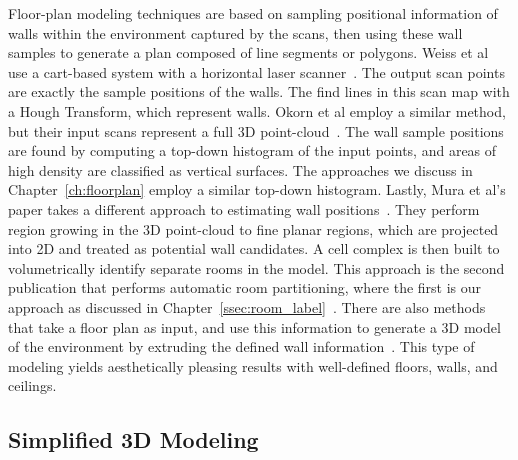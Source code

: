 \documentclass[12pt,onecolumn,oneside]{book}
\begin{document}
Floor-plan modeling techniques are based on sampling positional information of walls within the environment captured by the scans, then using these wall samples to generate a plan composed of line segments or polygons.  Weiss et al use a cart-based system with a horizontal laser scanner~\cite{Weiss05}.  The output scan points are exactly the sample positions of the walls.  The find lines in this scan map with a Hough Transform, which represent walls.  Okorn et al employ a similar method, but their input scans represent a full 3D point-cloud~\cite{Okorn09}.  The wall sample positions are found by computing a top-down histogram of the input points, and areas of high density are classified as vertical surfaces.  The approaches we discuss in Chapter~\ref{ch:floorplan} employ a similar top-down histogram.  Lastly, Mura et al's paper takes a different approach to estimating wall positions~\cite{Mura13}.  They perform region growing in the 3D point-cloud to fine planar regions, which are projected into 2D and treated as potential wall candidates.  A cell complex is then built to volumetrically identify separate rooms in the model.  This approach is the second publication that performs automatic room partitioning, where the first is our approach as discussed in Chapter~\ref{ssec:room_label}~\cite{Turner14}.  There are also methods that take a floor plan as input, and use this information to generate a 3D model of the environment by extruding the defined wall information~\cite{Or05,Lewis98}.  This type of modeling yields aesthetically pleasing results with well-defined floors, walls, and ceilings.

\subsection{Simplified 3D Modeling}
\label{ssec:background_planefit}
\end{document}
